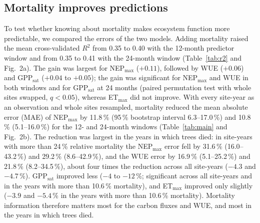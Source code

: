 \documentclass[11pt,a4paper]{article}
\begin{document}
\subsection*{Mortality improves predictions}
To test whether knowing about mortality makes ecosystem function more predictable, we compared the errors of the two
models. Adding mortality raised the mean cross-validated $R^2$ from 0.35 to 0.40 with the 12-month predictor window and
from 0.35 to 0.41 with the 24-month window (Table~\ref{tab:r2} and Fig.~2a). The gain was largest for NEP$_\mathrm{max}$ ($+0.11$), followed by WUE
($+0.06$) and GPP$_\mathrm{sat}$ ($+0.04$ to $+0.05$); the gain was significant for NEP$_\mathrm{max}$ and WUE in both windows and for
GPP$_\mathrm{sat}$ at 24 months (paired permutation test with whole sites swapped, $q<0.05$), whereas ET$_\mathrm{max}$ did not improve. With every site-year as an observation and whole
sites resampled, mortality reduced the mean absolute error (MAE) of NEP$_\mathrm{max}$ by 11.8\,\% (95\,\% bootstrap interval
6.3--17.0\,\%) and 10.8\,\% (5.1--16.0\,\%) for the 12- and 24-month windows (Table~\ref{tab:main} and Fig.~2b). The reduction was
largest in the years in which trees died: in site-years with more than 24\,\% relative mortality the NEP$_\mathrm{max}$ error fell by
31.6\,\% (16.0--43.2\,\%) and 29.2\,\% (8.6--42.9\,\%), and the WUE error by 16.9\,\% (5.1--25.2\,\%) and
21.8\,\% (8.2--34.5\,\%), about four times the reduction across all site-years ($-4.3$ and $-4.7$\,\%).
GPP$_\mathrm{sat}$ improved less ($-4$ to $-12$\,\%; significant across all site-years and in the years with more than 10.6\,\%
mortality), and ET$_\mathrm{max}$ improved only slightly ($-3.9$ and $-5.4$\,\% in the years with more than 10.6\,\% mortality).
Mortality information therefore matters most for the carbon fluxes and WUE, and most in the years in which trees died.
\end{document}
